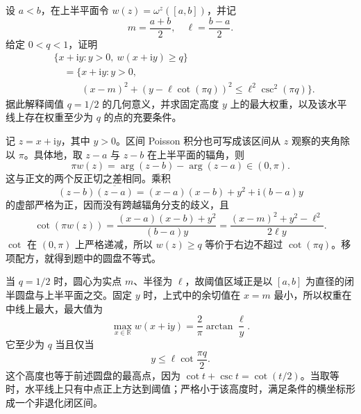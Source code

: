 \begin{exercise}[区间影响权重的阈值区域]\label{b3:ex:16-draft-03}
设 \(a<b\)，在上半平面令 \(w(z)=\omega^{z}([a,b])\)，并记
\[
 m=\frac{a+b}{2},\quad \ell=\frac{b-a}{2}.
\]
给定 \(0<q<1\)，证明
\[
 \begin{aligned}
 &\{x+\mathrm iy:y>0,\ w(x+\mathrm iy)\ge q\}\\
 &\quad=\bigl\{x+\mathrm iy:y>0,\\
 &\quad\phantom{=\bigl\{}(x-m)^2+(y-\ell\cot(\pi q))^2
 \le\ell^2\csc^2(\pi q)\bigr\}.
 \end{aligned}
\]
据此解释阈值 \(q=1/2\) 的几何意义，并求固定高度 \(y\) 上的最大权重，以及该水平线上存在权重至少为 \(q\) 的点的充要条件。
\end{exercise}
\begin{solution}
记 \(z=x+\mathrm iy\)，其中 \(y>0\)。区间 Poisson 积分也可写成该区间从 \(z\) 观察的夹角除以 \(\pi\)。具体地，取 \(z-a\) 与 \(z-b\) 在上半平面的辐角，则
\[
 \pi w(z)=\arg(z-b)-\arg(z-a)\in(0,\pi).
\]
这与正文的两个反正切之差相同。乘积
\[
 (z-b)\overline{(z-a)}
 =(x-a)(x-b)+y^2+\mathrm i(b-a)y
\]
的虚部严格为正，因而没有跨越辐角分支的歧义，且
\[
 \cot(\pi w(z))
 =\frac{(x-a)(x-b)+y^2}{(b-a)y}
 =\frac{(x-m)^2+y^2-\ell^2}{2\ell y}.
\]
\(\cot\) 在 \((0,\pi)\) 上严格递减，所以 \(w(z)\ge q\) 等价于右边不超过 \(\cot(\pi q)\)。移项配方，就得到题中的圆盘不等式。

当 \(q=1/2\) 时，圆心为实点 \(m\)、半径为 \(\ell\)，故阈值区域正是以 \([a,b]\) 为直径的闭半圆盘与上半平面之交。固定 \(y\) 时，上式中的余切值在 \(x=m\) 最小，所以权重在中线上最大，最大值为
\[
 \max_{x\in\mathbb R}w(x+\mathrm iy)
 =\frac2\pi\arctan\frac\ell y.
\]
它至少为 \(q\) 当且仅当
\[
 y\le\ell\cot\frac{\pi q}{2}.
\]
这个高度也等于前述圆盘的最高点，因为 \(\cot t+\csc t=\cot(t/2)\)。当取等时，水平线上只有中点正上方达到阈值；严格小于该高度时，满足条件的横坐标形成一个非退化闭区间。
\end{solution}

